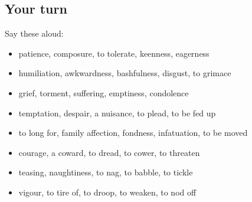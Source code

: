 \subsection*{Your turn}
Say these aloud:

\begin{itemize}
\raggedright
  \item patience, composure, to tolerate, keenness, eagerness
  \item humiliation, awkwardness, bashfulness, disgust, to grimace
  \item grief, torment, suffering, emptiness, condolence
  \item temptation, despair, a nuisance, to plead, to be fed up
  \item to long for, family affection, fondness, infatuation, to be moved
  \item courage, a coward, to dread, to cower, to threaten
  \item teasing, naughtiness, to nag, to babble, to tickle
  \item vigour, to tire of, to droop, to weaken, to nod off
\end{itemize}

